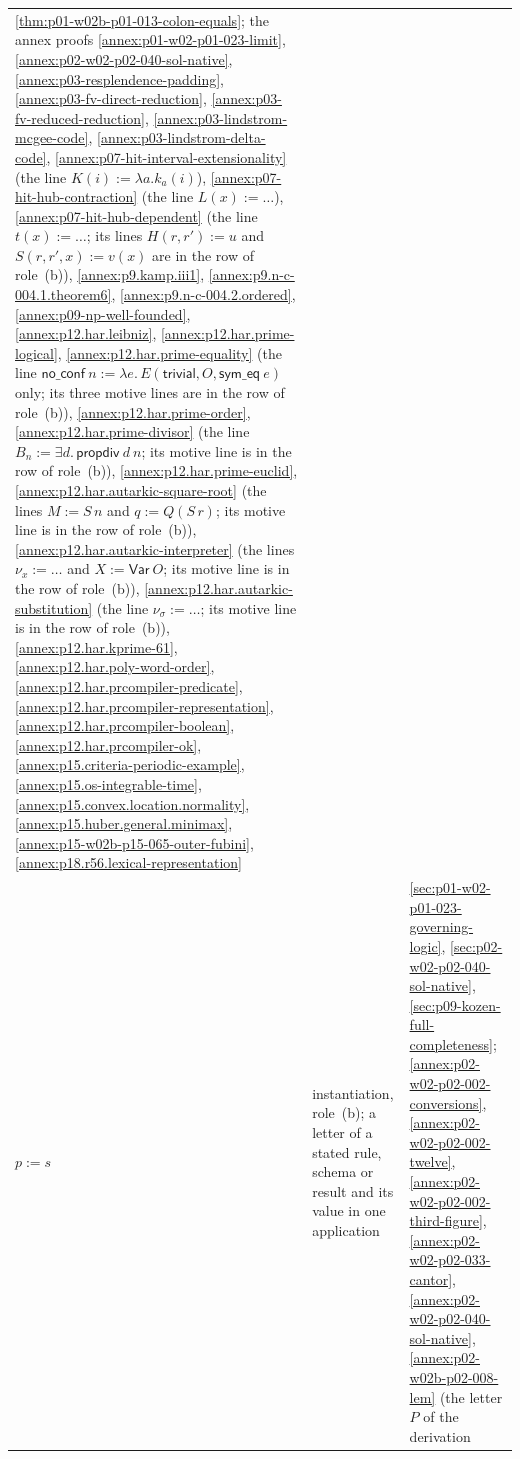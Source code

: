 \begin{longtable}{@{}p{}p{}p{}@{}}
\cref{thm:p01-w02b-p01-013-colon-equals}; the annex proofs
\cref{annex:p01-w02-p01-023-limit}, \cref{annex:p02-w02-p02-040-sol-native},
\cref{annex:p03-resplendence-padding}, \cref{annex:p03-fv-direct-reduction},
\cref{annex:p03-fv-reduced-reduction}, \cref{annex:p03-lindstrom-mcgee-code},
\cref{annex:p03-lindstrom-delta-code},
\cref{annex:p07-hit-interval-extensionality} (the line
\(K(i):=\lambda a.k_a(i)\)),
\cref{annex:p07-hit-hub-contraction} (the line \(L(x):=\ldots\)),
\cref{annex:p07-hit-hub-dependent} (the line \(t(x):=\ldots\); its
lines \(H(r,r'):=u\) and \(S(r,r',x):=v(x)\) are in the row of
role~(b)),
\cref{annex:p9.kamp.iii1}, \cref{annex:p9.n-c-004.1.theorem6},
\cref{annex:p9.n-c-004.2.ordered}, \cref{annex:p09-np-well-founded},
\cref{annex:p12.har.leibniz},
\cref{annex:p12.har.prime-logical}, \cref{annex:p12.har.prime-equality}
(the line \(\mathsf{no\_conf}\ n:=\lambda e.\,E(\mathsf{trivial},O,
\mathsf{sym\_eq}\ e)\) only; its three motive lines are in the row of
role~(b)), \cref{annex:p12.har.prime-order},
\cref{annex:p12.har.prime-divisor} (the line
\(B_n:=\exists d.\,\mathsf{propdiv}\ d\ n\); its motive line is in the row
of role~(b)), \cref{annex:p12.har.prime-euclid},
\cref{annex:p12.har.autarkic-square-root} (the lines \(M:=S\,n\) and
\(q:=Q(S\,r)\); its motive line is in the row of role~(b)),
\cref{annex:p12.har.autarkic-interpreter} (the lines \(\nu_x:=\ldots\) and
\(X:=\mathsf{Var}\ O\); its motive line is in the row of role~(b)),
\cref{annex:p12.har.autarkic-substitution} (the line
\(\nu_\sigma:=\ldots\); its motive line is in the row of role~(b)),
\cref{annex:p12.har.kprime-61}, \cref{annex:p12.har.poly-word-order},
\cref{annex:p12.har.prcompiler-predicate},
\cref{annex:p12.har.prcompiler-representation},
\cref{annex:p12.har.prcompiler-boolean}, \cref{annex:p12.har.prcompiler-ok},
\cref{annex:p15.criteria-periodic-example},
\cref{annex:p15.os-integrable-time},
\cref{annex:p15.convex.location.normality},
\cref{annex:p15.huber.general.minimax},
\cref{annex:p15-w02b-p15-065-outer-fubini},
\cref{annex:p18.r56.lexical-representation} \\
\(p:=s\) & instantiation, role~(b); a letter of a stated rule, schema or
result and its value in one application &
\cref{sec:p01-w02-p01-023-governing-logic},
\cref{sec:p02-w02-p02-040-sol-native}, \cref{sec:p09-kozen-full-completeness};
\cref{annex:p02-w02-p02-002-conversions},
\cref{annex:p02-w02-p02-002-twelve},
\cref{annex:p02-w02-p02-002-third-figure},
\cref{annex:p02-w02-p02-033-cantor}, \cref{annex:p02-w02-p02-040-sol-native},
\cref{annex:p02-w02b-p02-008-lem} (the letter \(P\) of the derivation

\end{longtable}

